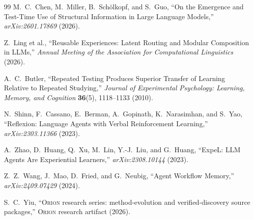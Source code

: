 \documentclass[11pt]{article}
\newcommand{\RAKL}{\textsc{Orion}}
\begin{document}
\begin{thebibliography}{99}
M.~C.~Chen, M.~Miller, B.~Sch\"olkopf, and S.~Guo,
``On the Emergence and Test-Time Use of Structural Information in Large Language Models,''
\emph{arXiv:2601.17869} (2026).

Z.~Ling et al.,
``Reusable Experiences: Latent Routing and Modular Composition in LLMs,''
\emph{Annual Meeting of the Association for Computational Linguistics} (2026).

A.~C.~Butler,
``Repeated Testing Produces Superior Transfer of Learning Relative to Repeated Studying,''
\emph{Journal of Experimental Psychology: Learning, Memory, and Cognition} \textbf{36}(5), 1118--1133 (2010).

N.~Shinn, F.~Cassano, E.~Berman, A.~Gopinath, K.~Narasimhan, and S.~Yao,
``Reflexion: Language Agents with Verbal Reinforcement Learning,''
\emph{arXiv:2303.11366} (2023).

A.~Zhao, D.~Huang, Q.~Xu, M.~Lin, Y.-J.~Liu, and G.~Huang,
``ExpeL: LLM Agents Are Experiential Learners,''
\emph{arXiv:2308.10144} (2023).

Z.~Z.~Wang, J.~Mao, D.~Fried, and G.~Neubig,
``Agent Workflow Memory,''
\emph{arXiv:2409.07429} (2024).

S.~C.~Yiu,
``\RAKL{} research series: method-evolution and verified-discovery source packages,''
\RAKL{} research artifact (2026).

\end{thebibliography}
\end{document}
